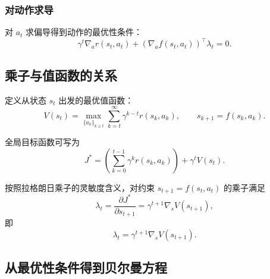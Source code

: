 \subsubsection*{对动作求导}

对 $a_t$ 求偏导得到动作的最优性条件：
\begin{equation}
    \gamma^{t}\nabla_a r(s_t,a_t)
    +
    \left(\nabla_a f(s_t,a_t)\right)^{\!\top} \lambda_t
    =0.
    \label{eq:kkt-action}
\end{equation}

\subsection{乘子与值函数的关系}

定义从状态 $s_t$ 出发的最优值函数：
\begin{equation}
    V(s_t)
    =
    \max_{\{a_k\}_{k\ge t}}
    \sum_{k=t}^{\infty}
        \gamma^{k-t} r(s_k,a_k),
    \qquad s_{k+1}=f(s_k,a_k).
\end{equation}

全局目标函数可写为
\[
J^*
=
\left(\sum_{k=0}^{t-1} \gamma^k r(s_k,a_k)\right)
+
\gamma^{t} V(s_t).
\]

按照拉格朗日乘子的灵敏度含义，对约束 $s_{t+1}=f(s_t,a_t)$ 的乘子满足
\[
\lambda_t
=
\frac{\partial J^*}{\partial s_{t+1}}
=
\gamma^{t+1}\nabla_s V(s_{t+1}),
\]
即
\begin{equation}
    \boxed{
    \lambda_t = \gamma^{t+1}\nabla_s V(s_{t+1})
    }.
    \label{eq:lambda-value}
\end{equation}

\subsection{从最优性条件得到贝尔曼方程}

